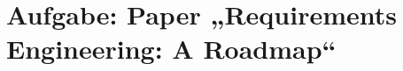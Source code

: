 

\newcommand{\dozent}{Lutz Prechelt}
\newcommand{\tutor}{Samuel Domiks}
\newcommand{\tutoriumNo}{02\\Materialien: Latex, Skript, Requirements Engineering: A Roadmap}
\newcommand{\ubungNo}{04}
\newcommand{\veranstaltung}{Softwaretechnik}
\newcommand{\semester}{SoSe21}
\newcommand{\studenten}{Jonny Lam \& Thore Brehmer}





\section{Aufgabe: Paper „Requirements Engineering: A Roadmap“}
